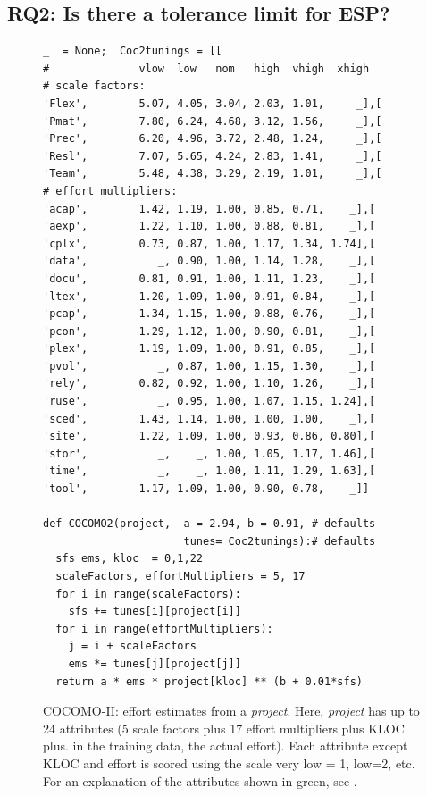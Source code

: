 \subsection{RQ2: Is there a tolerance limit for ESP?}\label{sect:rq2}

\begin{figure}[!t]
\begin{lstlisting}
_  = None;  Coc2tunings = [[
#              vlow  low   nom   high  vhigh  xhigh   
# scale factors:
'Flex',        5.07, 4.05, 3.04, 2.03, 1.01,     _],[
'Pmat',        7.80, 6.24, 4.68, 3.12, 1.56,     _],[
'Prec',        6.20, 4.96, 3.72, 2.48, 1.24,     _],[
'Resl',        7.07, 5.65, 4.24, 2.83, 1.41,     _],[
'Team',        5.48, 4.38, 3.29, 2.19, 1.01,     _],[
# effort multipliers:        
'acap',        1.42, 1.19, 1.00, 0.85, 0.71,    _],[
'aexp',        1.22, 1.10, 1.00, 0.88, 0.81,    _],[
'cplx',        0.73, 0.87, 1.00, 1.17, 1.34, 1.74],[
'data',           _, 0.90, 1.00, 1.14, 1.28,    _],[
'docu',        0.81, 0.91, 1.00, 1.11, 1.23,    _],[
'ltex',        1.20, 1.09, 1.00, 0.91, 0.84,    _],[
'pcap',        1.34, 1.15, 1.00, 0.88, 0.76,    _],[ 
'pcon',        1.29, 1.12, 1.00, 0.90, 0.81,    _],[
'plex',        1.19, 1.09, 1.00, 0.91, 0.85,    _],[ 
'pvol',           _, 0.87, 1.00, 1.15, 1.30,    _],[
'rely',        0.82, 0.92, 1.00, 1.10, 1.26,    _],[
'ruse',           _, 0.95, 1.00, 1.07, 1.15, 1.24],[
'sced',        1.43, 1.14, 1.00, 1.00, 1.00,    _],[ 
'site',        1.22, 1.09, 1.00, 0.93, 0.86, 0.80],[ 
'stor',           _,    _, 1.00, 1.05, 1.17, 1.46],[
'time',           _,    _, 1.00, 1.11, 1.29, 1.63],[
'tool',        1.17, 1.09, 1.00, 0.90, 0.78,    _]]

def COCOMO2(project,  a = 2.94, b = 0.91, # defaults
                      tunes= Coc2tunings):# defaults 
  sfs ems, kloc  = 0,1,22          
  scaleFactors, effortMultipliers = 5, 17
  for i in range(scaleFactors):
    sfs += tunes[i][project[i]]
  for i in range(effortMultipliers):
    j = i + scaleFactors
    ems *= tunes[j][project[j]] 
  return a * ems * project[kloc] ** (b + 0.01*sfs) 
\end{lstlisting}
\caption{COCOMO-II: effort estimates from a {\em project}.
Here, {\em project} has up to 24 attributes  (5 scale
factors plus 17 effort multipliers plus KLOC plus. in the training data, the actual effort).
Each attribute except KLOC and effort is scored
using the scale very low = 1, low=2, etc.
For an explanation of the attributes shown in
green, see .}\label{fig:coc2}
\end{figure}



